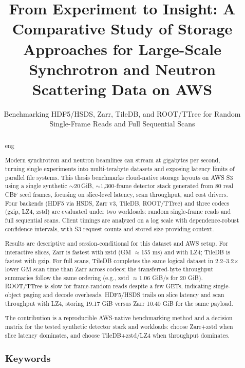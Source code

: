 \documentclass[nomenclature, english, bibtex]{kththesis}
\title{From Experiment to Insight: A Comparative Study of Storage Approaches for Large-Scale Synchrotron and Neutron Scattering Data on AWS}
\subtitle{Benchmarking HDF5/HSDS, Zarr, TileDB, and ROOT/TTree for Random Single-Frame Reads and Full Sequential Scans}
\numberwithin{listing}{chapter}
\begin{document}

\kthcover
\clearpage\thispagestyle{empty}\mbox{}
\titlepage

\bookinfopage

\frontmatter
\setcounter{page}{1}
\begin{abstract}
 \markboth{\abstractname}{}
\begin{scontents}[store-env=lang]
eng
\end{scontents}


\begin{scontents}[store-env=abstracts,print-env=true]
Modern synchrotron and neutron beamlines can stream at gigabytes per second, turning single experiments into multi-terabyte datasets and exposing latency limits of parallel file systems. This thesis benchmarks cloud-native storage layouts on AWS S3 using a single synthetic $\sim$20\,GiB, $\sim$1{,}300-frame detector stack generated from 80 real CBF seed frames, focusing on slice-level latency, scan throughput, and cost drivers. Four backends (HDF5 via HSDS, Zarr v3, TileDB, ROOT/TTree) and three codecs (gzip, LZ4, zstd) are evaluated under two workloads: random single-frame reads and full sequential scans. Client timings are analyzed on a log scale with dependence-robust confidence intervals, with S3 request counts and stored size providing context.

Results are descriptive and session-conditional for this dataset and AWS setup. For interactive slices, Zarr is fastest with zstd (GM $\approx$155 ms) and with LZ4; TileDB is fastest with gzip. For full scans, TileDB completes the same logical dataset in 2.2–3.2$\times$ lower GM scan time than Zarr across codecs; the transferred-byte throughput summaries follow the same ordering (e.g., zstd $\approx$1.06 GiB/s for 20 GiB). ROOT/TTree is slow for frame-random reads despite a few GETs, indicating single-object paging and decode overheads. HDF5/HSDS trails on slice latency and scan throughput with LZ4, storing 19.17 GiB versus Zarr 10.40 GiB for the same payload.

The contribution is a reproducible AWS-native benchmarking method and a decision matrix for the tested synthetic detector stack and workloads: choose Zarr+zstd when slice latency dominates, and choose TileDB+zstd/LZ4 when throughput dominates.
\end{scontents}


\subsection*{Keywords}
\begin{scontents}[store-env=keywords,print-env=true]
\end{scontents}

\end{abstract}
\end{document}
